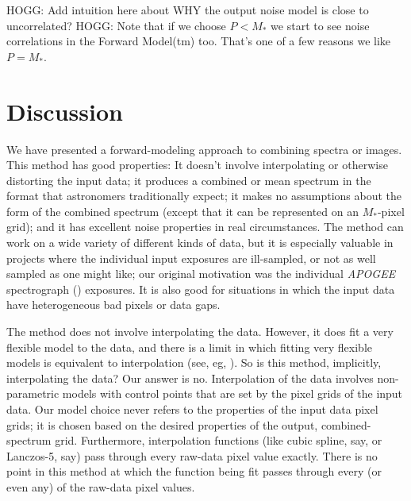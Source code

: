 \documentclass[modern]{aastex631}
\begin{document}
HOGG: Add intuition here about WHY the output noise model is close to uncorrelated?
HOGG: Note that if we choose $P<M_\ast$ we start to see noise correlations in the Forward Model(tm) too.
That's one of a few reasons we like $P=M_\ast$.

\section{Discussion}\label{sec:discussion}

We have presented a forward-modeling approach to combining spectra or images.
This method has good properties:
It doesn't involve interpolating or otherwise distorting the input data;
it produces a combined or mean spectrum in the format that astronomers traditionally expect;
it makes no assumptions about the form of the combined spectrum (except that it can be represented on an $M_\ast$-pixel grid);
and it has excellent noise properties in real circumstances.
The method can work on a wide variety of different kinds of data, but it is especially valuable in projects where the individual input exposures are ill-sampled, or not as well sampled as one might like; our original motivation was the individual \textsl{APOGEE} spectrograph (\citealt{apogeehardware}) exposures.
It is also good for situations in which the input data have heterogeneous bad pixels or data gaps.

The method does not involve interpolating the data.
However, it does fit a very flexible model to the data, and there is a limit in which fitting very flexible models is equivalent to interpolation (see, eg, \citealt{fittingflexible}).
So is this method, implicitly, interpolating the data?
Our answer is no.
Interpolation of the data involves non-parametric models with control points that are set by the pixel grids of the input data.
Our model choice never refers to the properties of the input data pixel grids; it is chosen based on the desired properties of the output, combined-spectrum grid.
Furthermore, interpolation functions (like cubic spline, say, or Lanczos-5, say) pass through every raw-data pixel value exactly.
There is no point in this method at which the function being fit passes through every (or even any) of the raw-data pixel values.
\end{document}
